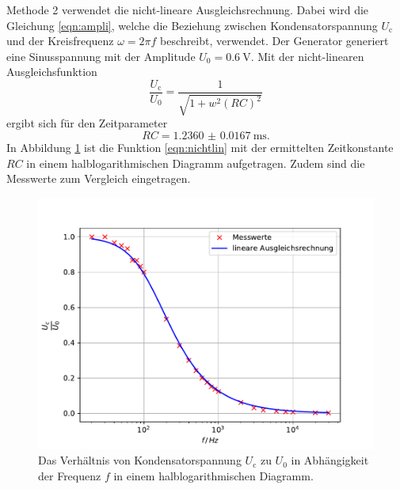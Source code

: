 Methode 2 verwendet die nicht-lineare Ausgleichsrechnung.
Dabei wird die Gleichung \ref{eqn:ampli}, welche die Beziehung zwischen Kondensatorspannung $U_\text{c}$ und der Kreisfrequenz $\omega = 2 \pi f$ beschreibt, verwendet.
Der Generator generiert eine Sinusspannung mit der Amplitude $U_0 = \SI{0.6}{\volt}$.
Mit der nicht-linearen Ausgleichsfunktion
\begin{equation}
    \frac{U_\text{c}}{U_0} = \frac{1}{\sqrt{1+w^2(RC)^2}}
    \label{eqn:nichtlin}
\end{equation}
ergibt sich für den Zeitparameter
\begin{equation*}
    RC = \SI{1.2360(167)}{\milli\second} .
\end{equation*}
In Abbildung \ref{fig:spannung} ist die Funktion \ref{eqn:nichtlin} mit der ermittelten Zeitkonstante $RC$ in einem halblogarithmischen Diagramm aufgetragen.
Zudem sind die Messwerte zum Vergleich eingetragen.
\begin{figure}
    \label{fig:spannung}
    \centering
    \includegraphics[width=\textwidth]{content/data/plotb.pdf}
    \caption{Das Verhältnis von Kondensatorspannung $U_\text{c}$ zu $U_0$ in Abhängigkeit der Frequenz $f$ in einem halblogarithmischen Diagramm.}
\end{figure}
\FloatBarrier

